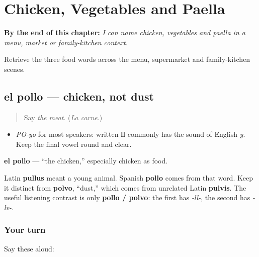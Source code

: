 
\chapter{Chicken, Vegetables and Paella}
\label{ch:pollo-verdura-paella}

\begin{chapteropening}
\textbf{By the end of this chapter:} \emph{I can name chicken, vegetables and paella in a menu, market or family-kitchen context.}

Retrieve the three food words across the menu, supermarket and family-kitchen scenes.
\end{chapteropening}

\section[el pollo]{el pollo — chicken, not dust}

\label{lesson:ES-C403-pollo}



\begin{quote}
Say \emph{the meat}. (\emph{La carne}.)
\end{quote}

\begin{sounds}
\begin{itemize}
\raggedright
  \item \emph{PO-yo} for most speakers: written \textbf{ll} commonly has the sound of English \emph{y}. Keep the final vowel round and clear.
\end{itemize}
\end{sounds}

\begin{cousinweb}
\textbf{el pollo} — “the chicken,” especially chicken as food.

Latin \textbf{pullus} meant a young animal. Spanish \textbf{pollo} comes from that word. Keep it distinct from \textbf{polvo}, “dust,” which comes from unrelated Latin \textbf{pulvis}. The useful listening contrast is only \textbf{pollo / polvo}: the first has \emph{-ll-}, the second has \emph{-lv-}.
\end{cousinweb}

\subsection*{Your turn}
Say these aloud:

